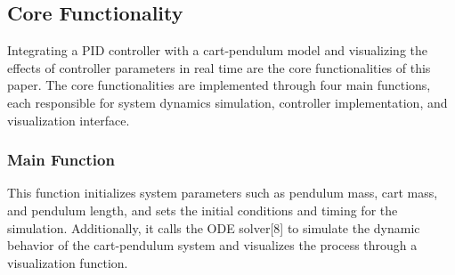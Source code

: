 \documentclass[journal,twoside,web]{ieeecolor}
\begin{document}
\subsection{Core Functionality}
Integrating a PID controller with a cart-pendulum model and visualizing the effects of controller parameters in real time are the core functionalities of this paper. 
The core functionalities are implemented through four main functions, each responsible for system dynamics simulation, controller implementation, and visualization interface.

\subsubsection{Main Function}
This function initializes system parameters such as pendulum mass, cart mass, and pendulum length, and sets the initial conditions and timing for the simulation. Additionally, it calls the ODE solver[8] to simulate the dynamic behavior of the cart-pendulum system and visualizes the process through a visualization function.
\end{document}
